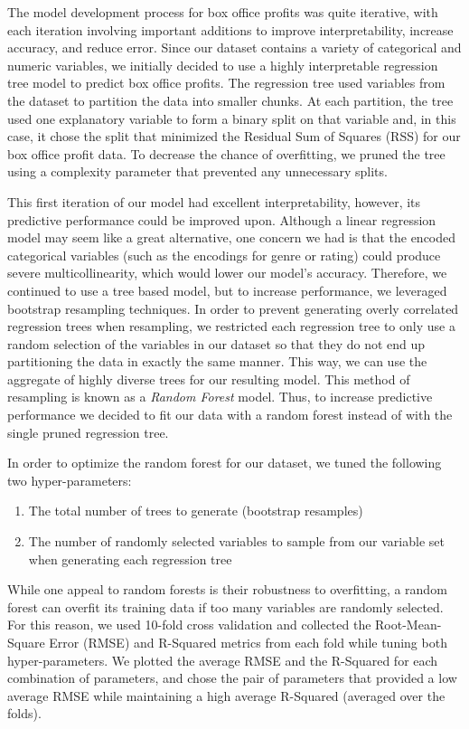 \documentclass[10pt]{article}
\begin{document}
The model development process for box office profits was quite iterative, with each iteration involving important additions to improve interpretability, increase accuracy, and reduce error. Since our dataset contains a variety of categorical and numeric variables, we initially decided to use a highly interpretable regression tree model to predict box office profits. The regression tree used variables from the dataset to partition the data into smaller chunks. At each partition, the tree used one explanatory variable to form a binary split on that variable and, in this case, it chose the split that minimized the Residual Sum of Squares (RSS) for our box office profit data. To decrease the chance of overfitting, we pruned the tree using a complexity parameter that prevented any unnecessary splits.

This first iteration of our model had excellent interpretability, however, its predictive performance could be improved upon. Although a linear regression model may seem like a great alternative, one concern we had is that the encoded categorical variables (such as the encodings for genre or rating) could produce severe multicollinearity, which would lower our model’s accuracy. Therefore, we continued to use a tree based model, but to increase performance, we leveraged bootstrap resampling techniques. In order to prevent generating overly correlated regression trees when resampling, we restricted each regression tree to only use a random selection of the variables in our dataset so that they do not end up partitioning the data in exactly the same manner. This way, we can use the aggregate of highly diverse trees for our resulting model. This method of resampling is known as a \textit{Random Forest} model. Thus, to increase predictive performance we decided to fit our data with a random forest instead of with the single pruned regression tree.

In order to optimize the random forest for our dataset, we tuned the following two hyper-parameters:

\begin{enumerate}
\item The total number of trees to generate (bootstrap resamples)
\item The number of randomly selected variables to sample from our variable set when generating each regression tree
\end{enumerate}

While one appeal to random forests is their robustness to overfitting, a random forest can overfit its training data if too many variables are randomly selected. For this reason, we used 10-fold cross validation and collected the Root-Mean-Square Error (RMSE) and R-Squared metrics from each fold while tuning both hyper-parameters. We plotted the average RMSE and the R-Squared for each combination of parameters, and chose the pair of parameters that provided a low average RMSE while maintaining a high average R-Squared (averaged over the folds).
\end{document}
